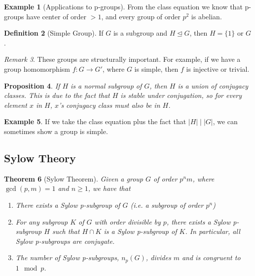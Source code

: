 \documentclass[12pt]{article}
\newtheorem{thm}{Theorem}[section]
\newtheorem{prop}[thm]{Proposition}
\theoremstyle{definition}
\newtheorem{defn}[thm]{Definition}
\newtheorem{eg}[thm]{Example}
\theoremstyle{remark}
\newtheorem{rmk}[thm]{Remark}
\numberwithin{equation}{section}
\newcommand\nsub{\trianglelefteq}
\begin{document}
\vspace{15pt}

\begin{eg}[Applications to p-groups]
        From the class equation we know that p-groups have center of order $> 1$, and every group of order $p^2$ is abelian.
\end{eg}


\vspace{15pt}

\begin{defn}[Simple Group]
        If $G$ is a subgroup and $H \nsub G$, then $H = \{1\}$ or $G$.
\end{defn}

\vspace{15pt}

\begin{rmk}
        These groups are structurally important. For example, if we have a group homomorphism $f:G\rightarrow G'$, where $G$ is simple, then $f$ is injective or trivial.
\end{rmk}


\vspace{15pt}

\begin{prop}
        If $H$ is a normal subgroup of $G$, then $H$ is a union of conjugacy classes. This is due to the fact that $H$ is stable under conjugation, so for every element $x$ in $H$, $x$'s conjugacy class must also be in $H$.
\end{prop}


\vspace{15pt}

\begin{eg}
        If we take the class equation plus the fact that $|H|\;\vert\;|G|$, we can sometimes show a group is simple.
\end{eg}

\vspace{15pt}


\subsection{Sylow Theory}

\begin{thm}[Sylow Theorem]
        Given a group $G$ of order $p^nm$, where $\gcd(p,m) = 1$ and $n \geq 1$, we have that \begin{enumerate}
                \item There exists a Sylow p-subgroup of $G$ (i.e. a subgroup of order $p^n$)
                \item For any subgroup $K$ of $G$ with order divisible by $p$, there exists a Sylow p-subgroup $H$ such that $H \cap K$ is a Sylow p-subgroup of $K$. In particular, all Sylow p-subgroups are conjugate.
                \item The number of Sylow p-subgroups, $n_p(G)$, divides $m$ and is congruent to $1 \mod p$.
        \end{enumerate}
\end{thm}
\end{document}
